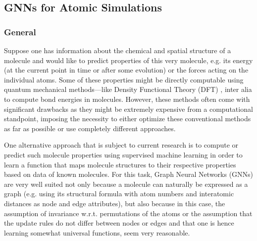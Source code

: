 \subsection{GNNs for Atomic Simulations}
\label{subsec:atomic-simulations}

\subsubsection{General}

Suppose one has information about the chemical and spatial structure of a molecule 
and would like to predict properties of this very molecule, e.g. its energy (at the 
current point in time or after some evolution) or the forces acting on the 
individual atoms. Some of these properties might be directly
computable using quantum mechanical methods---like Density Functional Theory (DFT) 
\cite{doi:10.1021/ed5004788}, inter alia
to compute bond energies in molecules. However, these methods often come
with significant drawbacks as they might be extremely expensive from a computational 
standpoint, imposing the necessity to either optimize these conventional methods 
as far as possible or use completely different approaches.

One alternative approach that is subject to current research is to compute or 
predict such molecule properties using supervised
machine learning in order to learn a function that maps molecule structures to their
respective properties based on data of known molecules. For this task, Graph
Neural Networks (GNNs) are very well suited not only because a molecule can naturally
be expressed as a graph (e.g. using its structural formula with atom numbers and
interatomic distances as node and edge attributes), but also because in this case, the 
assumption of invariance w.r.t. permutations of the atoms or the assumption that 
the update rules do not differ between nodes or edges and that one is hence
learning somewhat universal functions, seem very reasonable.

